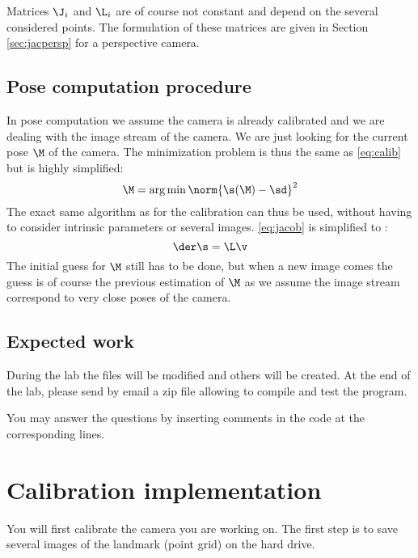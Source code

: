 \documentclass{ecnreport}
\begin{document}
Matrices $\J_i$ and $\L_i$ are of course not constant and depend on the several considered points. The formulation of these matrices are given in Section \ref{sec:jacpersp} for a perspective camera.

\subsection{Pose computation procedure}
\label{sec:pose}
In pose computation we assume the camera is already calibrated and we are dealing with the image stream of the camera.
We are just looking for the current pose $\M$ of the camera.
The minimization problem is thus the same as \eqref{eq:calib} but is highly simplified:
\begin{equation}\label{eq:pose comp}
\M = \arg\min \norm{\s(\M) - \sd}^2
\end{equation}The exact same algorithm as for the calibration can thus be used, without having to consider intrinsic parameters or several images.
\eqref{eq:jacob} is simplified to :
\begin{equation}
 \der\s =  \L\v
\end{equation}
The initial guess for $\M$ still has to be done, but when a new image comes the guess is of course the previous estimation of $\M$ as we assume the image stream 
correspond to very close poses of the camera.

\subsection{Expected work}

During the lab the files will be modified and others will be created.
At the end of the lab, please send by email a zip file allowing to compile and test the program.

You may answer the questions by inserting comments in the code at the corresponding lines.
\newpage

\section{Calibration implementation}

You will first calibrate the camera you are working on. The first step is to save several images of the landmark (point grid) on the hard drive.
\end{document}

